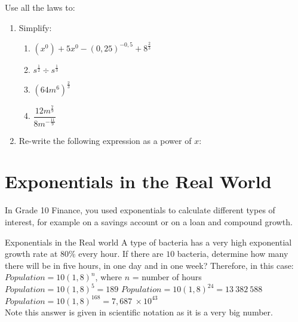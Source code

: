 

{
Use all the laws to:
\begin{enumerate}
\item{Simplify:

\begin{enumerate}
\item$(x^0)+5x^0-(0,25)^{-0,5}+8^{\frac{2}{3}}$ 
\item$s^{\frac{1}{2}}\div s^{\frac{1}{3}}$\\
\item$(64m^6)^\frac{2}{3}$\\
\item $\dfrac{12m^{\frac{7}{9}}}{8m^{-\frac{11}{9}}}$\\

\end{enumerate}
}
\item{Re-write the following expression as a power of $x$:
}
\end{enumerate}


}

\section{Exponentials in the Real World}
In Grade 10 Finance, you used exponentials to calculate different types of interest, for example on a savings account or on a loan and compound growth. 

\begin{wex}{Exponentials in the Real world}
{A type of bacteria has a very high exponential growth rate at $80\%$ every hour. If there are $10$ bacteria, determine how many there will be in five hours, in one day and in one week?}{ 
Therefore, in this case:\\
$Population = 10(1,8)^n$,   where $n$ = number of hours
$Population =10(1,8)^5 = 189$
$Population = 10(1,8)^{24} = 13~382~588$
$Population = 10(1,8)^{168} = 7,687 ~\times 10^{43}$\\
Note this answer is given in scientific notation as it is a very big number.}
\end{wex}

